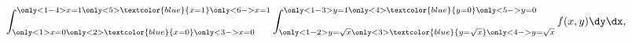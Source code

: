 \begin{frame}
{    
  }
  \vspace{-0.5cm}
  \begin{equation*}
      \int_{\only<1>{x = 0}\only<2>{\textcolor{blue}{x=0}}\only<3->{x=0}}^{\only<1-4>{x = 1}\only<5>{\textcolor{blue}{x=1}}\only<6->{x=1}} \int_{\only<1-2>{y = \sqrt{x}}\only<3>{\textcolor{blue}{y=\sqrt{x}}}\only<4->{y=\sqrt{x}}}^{\only<1-3>{y = 1}\only<4>{\textcolor{blue}{y=0}}\only<5->{y=0}} f(x,y) \dy \dx,
  \end{equation*}
\end{frame}

